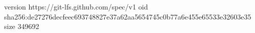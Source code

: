 version https://git-lfs.github.com/spec/v1
oid sha256:de27276decfeec693748827e37a62aa5654745c0b77a6e455e65533e32603e35
size 349692
